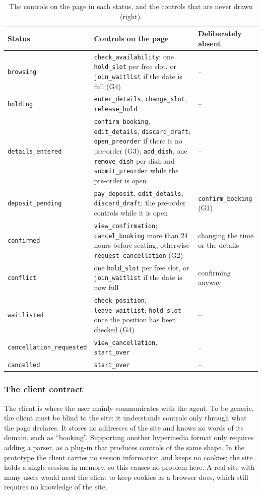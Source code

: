 \begin{table}[htbp]
\centering
\caption{The controls on the page in each status, and the controls that are never drawn (right).}
\label{tab:impl:states}
\renewcommand{\arraystretch}{1.15}
\small
\begin{tabularx}{\textwidth}{lLP{0.2\textwidth}}
\hline
Status & Controls on the page & Deliberately absent \\
\hline
\texttt{browsing} & \texttt{check\_availability}; one \texttt{hold\_slot} per free slot, or \texttt{join\_waitlist} if the date is full (G4) & -- \\
\hline
\texttt{holding} & \texttt{enter\_details}, \texttt{change\_slot}, \texttt{release\_hold} & -- \\
\hline
\texttt{details\_entered} & \texttt{confirm\_booking}, \texttt{edit\_details}, \texttt{discard\_draft}; \texttt{open\_preorder} if there is no pre-order (G3); \texttt{add\_dish}, one \texttt{remove\_dish} per dish and \texttt{submit\_preorder} while the pre-order is open & -- \\
\hline
\texttt{deposit\_pending} & \texttt{pay\_deposit}, \texttt{edit\_details}, \texttt{discard\_draft}; the pre-order controls while it is open & \texttt{confirm\_booking} (G1) \\
\hline
\texttt{confirmed} & \texttt{view\_confirmation}; \texttt{cancel\_booking} more than 24 hours before seating, otherwise \texttt{request\_cancellation} (G2) & changing the time or the details \\
\hline
\texttt{conflict} & one \texttt{hold\_slot} per free slot, or \texttt{join\_waitlist} if the date is now full & confirming anyway \\
\hline
\texttt{waitlisted} & \texttt{check\_position}, \texttt{leave\_waitlist}; \texttt{hold\_slot} once the position has been checked (G4) & -- \\
\hline
\texttt{cancellation\_requested} & \texttt{view\_cancellation}, \texttt{start\_over} & -- \\
\hline
\texttt{cancelled} & \texttt{start\_over} & -- \\
\hline
\end{tabularx}
\end{table}

\subsubsection{The client contract}\label{sec:design:client-contract}

The client is where the user mainly communicates with the agent.
To be generic, the client must be blind to the site: it understands controls only through what the page declares.
It stores no addresses of the site and knows no words of its domain, such as ``booking''.
Supporting another hypermedia format only requires adding a parser, as a plug-in that produces controls of the same shape.
In the prototype the client carries no session information and keeps no cookies; the site holds a single session in memory, so this causes no problem here.
A real site with many users would need the client to keep cookies as a browser does, which still requires no knowledge of the site.

